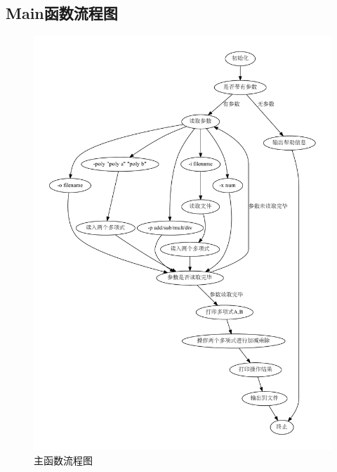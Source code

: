 \subsection{Main函数流程图}
\begin{figure}[H]
    \centering
    \includegraphics[width=0.7\linewidth]{figures/main}
    \caption{主函数流程图}
    \label{fig:main}
\end{figure}